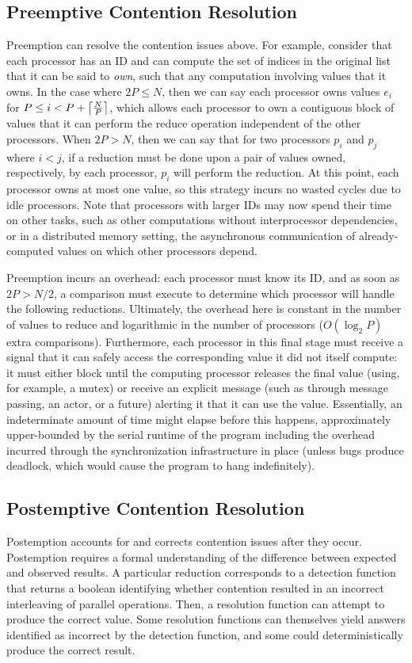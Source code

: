 \subsection{Preemptive Contention Resolution}
Preemption can resolve the contention issues above. For example, consider that
each processor has an ID and can compute the set of indices in the original list
that it can be said to \emph{own}, such that any computation involving values
that it owns. In the case where $2P \leq N$, then we can say each processor owns
values $e_i$ for $P \leq i < P + \ceil*{\frac{N}{P}}$, which allows each
processor to own a contiguous block of values that it can perform the reduce
operation independent of the other processors. When $2P > N$, then we can say
that for two processors $p_i$ and $p_j$ where $i < j$, if a reduction must be
done upon a pair of values owned, respectively, by each processor, $p_i$ will
perform the reduction. At this point, each processor owns at most one value, so
this strategy incurs no wasted cycles due to idle processors. Note that
processors with larger IDs may now spend their time on other tasks, such as
other computations without interprocessor dependencies, or in a distributed
memory setting, the asynchronous communication of already-computed values on
which other processors depend.

Preemption incurs an overhead: each processor must know its ID, and as soon as
$2P > N/2$, a comparison must execute to determine which processor will handle
the following reductions. Ultimately, the overhead here is constant in the number
of values to reduce and logarithmic in the number of processors ($O(\log_2 P)$
extra comparisons). Furthermore, each processor in this final stage must receive
a signal that it can safely access the corresponding value it did not itself
compute: it must either block until the computing processor releases the final
value (using, for example, a mutex) or receive an explicit message (such as
through message passing, an actor, or a future) alerting it that it can use the
value. Essentially, an indeterminate amount of time might elapse before this
happens, approximately upper-bounded by the serial runtime of the program
including the overhead incurred through the synchronization infrastructure in
place (unless bugs produce deadlock, which would cause the program to hang
indefinitely).

\subsection{Postemptive Contention Resolution}
Postemption accounts for and corrects contention issues after they occur.
Postemption requires a formal understanding of the difference between expected
and observed results. A particular reduction corresponds to a detection function
that returns a boolean identifying whether contention resulted in an incorrect
interleaving of parallel operations. Then, a resolution function can attempt to
produce the correct value. Some resolution functions can themselves yield
answers identified as incorrect by the detection function, and some could
deterministically produce the correct result.

